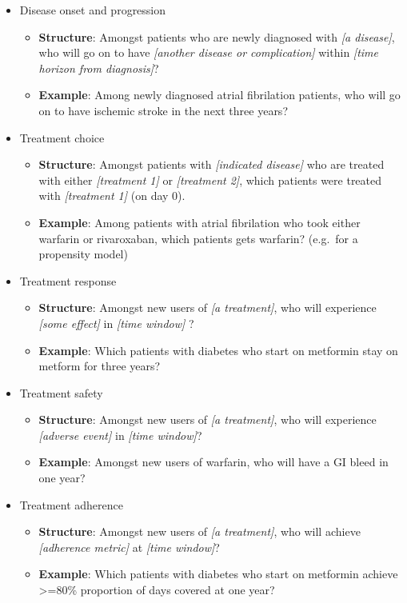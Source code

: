 \documentclass[11pt]{book}
\providecommand{\tightlist}{%
  \setlength{\itemsep}{0pt}\setlength{\parskip}{0pt}}
\theoremstyle{definition}
\theoremstyle{definition}
\theoremstyle{definition}
\theoremstyle{remark}
\begin{document}
\begin{itemize}
\tightlist
\item
  Disease onset and progression

  \begin{itemize}
  \tightlist
  \item
    \textbf{Structure}: Amongst patients who are newly diagnosed with \emph{{[}a disease{]}}, who will go on to have \emph{{[}another disease or complication{]}} within \emph{{[}time horizon from diagnosis{]}}?
  \item
    \textbf{Example}: Among newly diagnosed atrial fibrilation patients, who will go on to have ischemic stroke in the next three years?
  \end{itemize}
\item
  Treatment choice

  \begin{itemize}
  \tightlist
  \item
    \textbf{Structure}: Amongst patients with \emph{{[}indicated disease{]}} who are treated with either \emph{{[}treatment 1{]}} or \emph{{[}treatment 2{]}}, which patients were treated with \emph{{[}treatment 1{]}} (on day 0).
  \item
    \textbf{Example}: Among patients with atrial fibrilation who took either warfarin or rivaroxaban, which patients gets warfarin? (e.g.~for a propensity model)
  \end{itemize}
\item
  Treatment response

  \begin{itemize}
  \tightlist
  \item
    \textbf{Structure}: Amongst new users of \emph{{[}a treatment{]}}, who will experience \emph{{[}some effect{]}} in \emph{{[}time window{]}} ?
  \item
    \textbf{Example}: Which patients with diabetes who start on metformin stay on metform for three years?
  \end{itemize}
\item
  Treatment safety

  \begin{itemize}
  \tightlist
  \item
    \textbf{Structure}: Amongst new users of \emph{{[}a treatment{]}}, who will experience \emph{{[}adverse event{]}} in \emph{{[}time window{]}}?
  \item
    \textbf{Example}: Amongst new users of warfarin, who will have a GI bleed in one year?
  \end{itemize}
\item
  Treatment adherence

  \begin{itemize}
  \tightlist
  \item
    \textbf{Structure}: Amongst new users of \emph{{[}a treatment{]}}, who will achieve \emph{{[}adherence metric{]}} at \emph{{[}time window{]}}?
  \item
    \textbf{Example}: Which patients with diabetes who start on metformin achieve \textgreater=80\% proportion of days covered at one year?
  \end{itemize}
\end{itemize}
\end{document}

